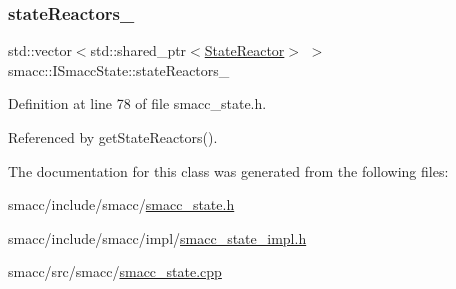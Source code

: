 \subsubsection{\texorpdfstring{state\+Reactors\+\_\+}{stateReactors\_}}
{\footnotesize\ttfamily std\+::vector$<$std\+::shared\+\_\+ptr$<$\hyperlink{classsmacc_1_1StateReactor}{State\+Reactor}$>$ $>$ smacc\+::\+I\+Smacc\+State\+::state\+Reactors\+\_\+\hspace{0.3cm}{\ttfamily [protected]}}



Definition at line 78 of file smacc\+\_\+state.\+h.



Referenced by get\+State\+Reactors().



The documentation for this class was generated from the following files\+:\begin{DoxyCompactItemize}
\item 
smacc/include/smacc/\hyperlink{smacc__state_8h}{smacc\+\_\+state.\+h}\item 
smacc/include/smacc/impl/\hyperlink{smacc__state__impl_8h}{smacc\+\_\+state\+\_\+impl.\+h}\item 
smacc/src/smacc/\hyperlink{smacc__state_8cpp}{smacc\+\_\+state.\+cpp}\end{DoxyCompactItemize}
